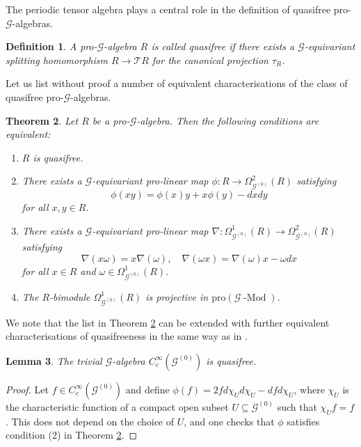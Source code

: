 \documentclass{amsart}
\newtheorem{thm}{Theorem}[section]
\newtheorem{dfn}[thm]{Definition}
\newtheorem{lemma}[thm]{Lemma}
\newcommand{\G}{\mathcal{G}}
\newcommand{\T}{\mathcal{T}}
\newcommand{\ccinfty}{C_c^\infty}
\newcommand{\pro}{\mathrm{pro}}
\begin{document}
The periodic tensor algebra plays a central role in the definition of quasifree pro-$ \G $-algebras. 

\begin{dfn}
A pro-$ \G $-algebra $ R $ is called quasifree if there exists a $ \G $-equivariant splitting homomorphism $ R \rightarrow \T R $ for the canonical projection $ \tau_R $.  
\end{dfn}

Let us list without proof a number of equivalent characterisations of the class of quasifree pro-$ \G $-algebras.

\begin{thm}\label{thm: characterization of quasi-free algebras}
Let $ R $ be a pro-$ \G $-algebra. Then the following conditions are equivalent:
\begin{enumerate}
\item $ R $ is quasifree.
\item There exists a $ \G $-equivariant pro-linear map $\phi: R \rightarrow \Omega_{\G^{(0)}}^2(R) $ satisfying
$$
\phi(x y)=\phi(x) y+x \phi(y)-d x d y
$$
for all  $x, y \in R $.
\item There exists a $ \G $-equivariant pro-linear map $ \nabla: \Omega_{\G^{(0)}}^1(R) \rightarrow \Omega_{\G^{(0)}}^2(R) $ satisfying
$$
\nabla(x \omega) = x \nabla(\omega), \quad \nabla(\omega x) = \nabla(\omega) x-\omega d x
$$
for all $ x \in R $ and $ \omega \in \Omega_{\G^{(0)}}^1(R) $.
\item The $ R $-bimodule $ \Omega_{\G^{(0)}}^1(R) $ is projective in $ \pro(\G \operatorname{-Mod}) $.
\end{enumerate}
\end{thm}

We note that the list in Theorem \ref{thm: characterization of quasi-free algebras} can be extended with further equivalent characterisations of quasifreeness in the same way as 
in \cite[Theorem 6.5]{VOIGT_equivariantperiodiccyclichomology}. 

\begin{lemma} \label{trivialquasifree}
The trivial $ \G $-algebra $ \ccinfty(\G^{(0)}) $ is quasifree.
\end{lemma}

\begin{proof}
Let $ f \in \ccinfty(\G^{(0)}) $ and define $ \phi(f) = 2 f d \chi_U d\chi_U - df d\chi_U $, where $ \chi_U $ is the characteristic function of a compact open 
subset $ U \subseteq \G^{(0)} $ such that $ \chi_U f = f $. This does not depend on the choice of $ U $, and one checks that $ \phi $ satisfies condition (2) in 
Theorem \ref{thm: characterization of quasi-free algebras}. 
\end{proof}
\end{document}
